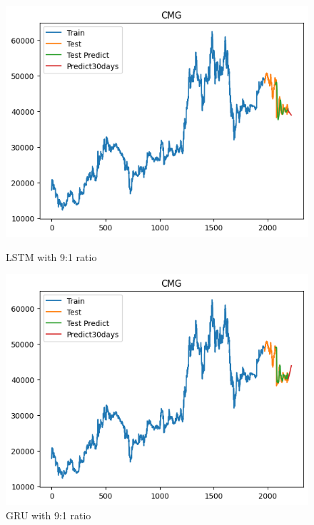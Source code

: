 \documentclass[conference]{IEEEtran}
\begin{document}
\begin{figure}[H]
    \centering
    \begin{minipage}{0.24\textwidth}
        \centering
        \includegraphics[width=\textwidth]{Figure/CMG/lstm91.png}
        \caption{LSTM with 9:1 ratio}
        \label{fig:image1}
    \end{minipage}
    \hfill
    \begin{minipage}{0.24\textwidth}
        \centering
        \includegraphics[width=\textwidth]{Figure/CMG/gru91.png}
        \caption{GRU with 9:1 ratio}
        \label{fig:image2}
    \end{minipage}
\end{figure}
\end{document}
